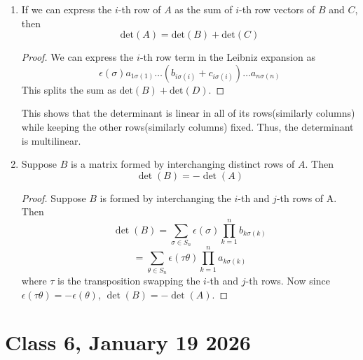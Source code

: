 \documentclass{article}
\begin{document}
\begin{enumerate}
\begin{proof}
Suppose we multiply the $i$-th row by $\alpha$. Since exactly one entry from this row appears in the Leibniz expansion of the determinant, they will all be scaled by $\alpha$. Thus 
$$\det(A^{'})=\alpha\sum_{\sigma\in S_n}\prod_{k=1}^{n}a_{k\sigma(k)}=\alpha\text{det}(A)$$
where $A^{'}$ is the matrix $A$ with the $i$-th row scaled by $\alpha$.
\end{proof}
\item If we can express the $i$-th row of $A$ as the sum of $i$-th row vectors of $B$ and $C$, then 
 $$\text{det}(A)=\text{det}(B)+\text{det}(C)$$
 \begin{proof}
 We can express the $i$-th row term in the Leibniz expansion as
 $$\epsilon(\sigma)a_{1\sigma(1)}\dots (b_{i\sigma(i)}+c_{i\sigma(i)})\dots a_{n\sigma(n)}$$
 This splits the sum as $\text{det}(B)+\text{det}(D)$.
\end{proof}
This shows that the determinant is linear in all of its rows(similarly columns) while keeping the other rows(similarly columns) fixed. Thus, the determinant is multilinear.
\item Suppose $B$ is a matrix formed by interchanging distinct rows of $A$. Then 
$$\det{(B)}=-\det{(A)}$$
\begin{proof}
    Suppose $B$ is formed by interchanging the $i$-th and $j$-th rows of A. Then 
    $$\det{(B)}=\sum_{\sigma\in S_n}\epsilon(\sigma)\prod_{k=1}^{n}b_{k\sigma(k)}$$
    $$=\sum_{\theta\in S_n}\epsilon(\tau\theta)\prod_{k=1}^{n}a_{k\sigma(k)}$$
where $\tau$ is the transposition swapping the $i$-th and $j$-th rows. Now since $\epsilon(\tau\theta)=-\epsilon(\theta)$, $\det{(B)}=-\det{(A)}$.
\end{proof}
\end{enumerate}
\section*{Class 6, January 19 2026}
\end{document}
